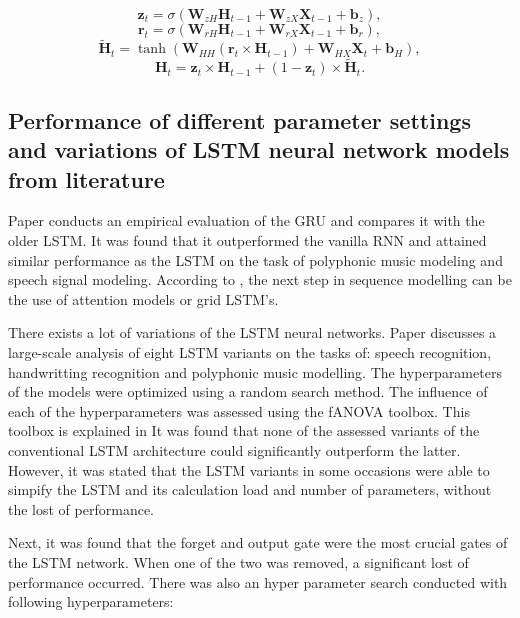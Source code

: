 \begin{equation}
	\textbf{z}_{t} = \sigma(\textbf{W}_{zH}\textbf{H}_{t-1}+\textbf{W}_{zX}\textbf{X}_{t-1}+\textbf{b}_{z}),
\end{equation}
\begin{equation}
	\textbf{r}_{t} = \sigma(\textbf{W}_{rH}\textbf{H}_{t-1}+\textbf{W}_{rX}\textbf{X}_{t-1}+\textbf{b}_{r}),
\end{equation}
\begin{equation}
	\tilde{\textbf{H}}_{t}=\tanh(\textbf{W}_{HH}(\textbf{r}_t\times\textbf{H}_{t-1})+\textbf{W}_{HX}\textbf{X}_t+\textbf{b}_H),
\end{equation}
\begin{equation}
	\textbf{H}_t=\textbf{z}_t\times\textbf{H}_{t-1}+(1-\textbf{z}_t)\times\tilde{\textbf{H}}_t.
\end{equation}

\subsection{Performance of different parameter settings and variations of LSTM neural network models from literature}\label{s:Performance results between different models}
Paper \cite{Chung2014} conducts an empirical evaluation of the GRU and compares it with the older LSTM. It was found that it outperformed the vanilla RNN and attained similar performance as the LSTM on the task of polyphonic music modeling and speech signal modeling. 
According to \cite{Olah}, the next step in sequence modelling can be the use of attention models or grid LSTM's.

There exists a lot of variations of the LSTM neural networks. Paper \cite{Greff2017} discusses a large-scale analysis of eight LSTM variants on the tasks of: speech recognition, handwritting recognition and polyphonic music modelling. The hyperparameters of the models were optimized using a random search method. The influence of each of the hyperparameters was assessed using the fANOVA toolbox. This toolbox is explained in \cite{Hutter2014} It was found that none of the assessed variants of the conventional LSTM architecture could significantly outperform the latter. However, it was stated that the LSTM variants in some occasions were able to simpify the LSTM and its calculation load and number of parameters, without the lost of performance.  

Next, it was found that the forget and output gate were the most crucial gates of the LSTM network. When one of the two was removed, a significant lost of performance occurred. There was also an hyper parameter search conducted with following hyperparameters:

